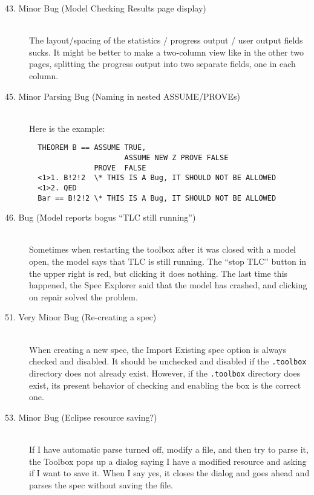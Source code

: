 \documentclass{article}
\begin{document}
\begin{description}
\item[43. Minor Bug (Model Checking Results page display)] \mbox{}\\
%
The layout/spacing of the statistics / progress output / user output
fields sucks.  It might be better to make a two-column view like in
the other two pages, splitting the progress output into two separate
fields, one in each column.

\item[45. Minor Parsing Bug (Naming in nested ASSUME/PROVEs)] \mbox{}\\
%
Here is the example:
\begin{verbatim}
  THEOREM B == ASSUME TRUE, 
                      ASSUME NEW Z PROVE FALSE
               PROVE  FALSE
  <1>1. B!2!2  \* THIS IS A Bug, IT SHOULD NOT BE ALLOWED
  <1>2. QED
  Bar == B!2!2 \* THIS IS A Bug, IT SHOULD NOT BE ALLOWED
\end{verbatim}

\item[46. Bug (Model reports bogus ``TLC still running'')] \mbox{}\\
%
Sometimes when restarting the toolbox after it was closed with a model
open, the model says that TLC is still running.  The ``stop TLC'' button
in the upper right is red, but clicking it does nothing.  
The last time this happened, the Spec Explorer said that the model
has crashed, and clicking on repair solved the problem.
  

\item[51. Very Minor Bug (Re-creating a spec)] \mbox{}\\
%
When creating a new spec, the Import Existing spec option is always
checked and disabled.  It should be unchecked and disabled if the
\texttt{.toolbox} directory does not already exist.  However, if the 
\texttt{.toolbox}
directory does exist, its present behavior of checking and enabling
the box is the correct one.  

\item[53. Minor Bug (Eclipse resource saving?)] \mbox{}\\
%
If I have automatic parse turned off, modify a file, and then try to
parse it, the Toolbox pops up a dialog saying I have a modified
resource and asking if I want to save it.  When I say yes, it closes
the dialog and goes ahead and parses the spec without saving the file.


\end{description}
\end{document}
